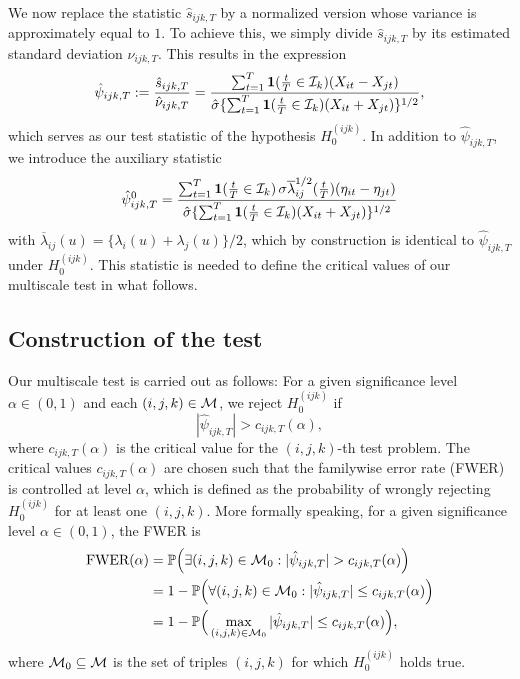 \documentclass[a4paper,12pt]{article}
\numberwithin{equation}{section}
\begin{document}
{We now replace the statistic $\hat{s}_{ijk,T}$ by a normalized version whose variance is approximately equal to $1$. To achieve this, we simply divide $\hat{s}_{ijk,T}$ by its estimated standard deviation $\hat{\nu}_{ijk,T}$. This results in the expression 
\begin{equation}\label{eq:stat}
\hat{\psi}_{ijk,T} := \frac{\hat{s}_{ijk,T}}{\hat{\nu}_{ijk,T}} = \frac{\sum\nolimits_{t=1}^T \boldsymbol{1}(\frac{t}{T} \in \mathcal{I}_k) (X_{it} - X_{jt})}{ \hat{\sigma} \{ \sum\nolimits_{t=1}^T \boldsymbol{1}(\frac{t}{T} \in \mathcal{I}_k) (X_{it} + X_{jt}) \}^{1/2}}, 
\end{equation}
which serves as our test statistic of the hypothesis $H_0^{(ijk)}$. In addition to $\hat{\psi}_{ijk,T}$, we introduce the auxiliary statistic 
\begin{equation}\label{eq:stat0}
\hat{\psi}_{ijk,T}^0 = \frac{\sum\nolimits_{t=1}^T \boldsymbol{1}(\frac{t}{T} \in \mathcal{I}_k) \, \sigma \overline{\lambda}_{ij}^{1/2}(\frac{t}{T}) (\eta_{it} - \eta_{jt})}{ \hat{\sigma} \{ \sum\nolimits_{t=1}^T \boldsymbol{1}(\frac{t}{T} \in \mathcal{I}_k) (X_{it} + X_{jt}) \}^{1/2}}
\end{equation}
with $\overline{\lambda}_{ij}(u) = \{ \lambda_i(u) + \lambda_j(u) \}/2$, which by construction is identical to $\hat{\psi}_{ijk,T}$ under $H_0^{(ijk)}$. This statistic is needed to define the critical values of our multiscale test in what follows.
}


\subsection{Construction of the test} 


Our multiscale test is carried out as follows: For a given significance level $\alpha \in (0,1)$ and each $(i,j,k) \in \mathcal{M}$, we reject $H_0^{(ijk)}$ if 
\[ |\hat{\psi}_{ijk,T}| > c_{ijk,T}(\alpha), \]
where $c_{ijk,T}(\alpha)$ is the critical value for the $(i,j,k)$-th test problem. The critical values $c_{ijk,T}(\alpha)$ are chosen such that the familywise error rate (FWER) is controlled at level $\alpha$, which is defined as the probability of wrongly rejecting $H_0^{(ijk)}$ for at least one $(i,j,k)$. More formally speaking, for a given significance level $\alpha \in (0,1)$, the FWER is 
\begin{align*}
\text{FWER}(\alpha) 
 & = \mathbb{P} \Big( \exists (i,j,k) \in \mathcal{M}_0: |\hat{\psi}_{ijk,T}| > c_{ijk,T}(\alpha) \Big) \\
 & =  1 - \mathbb{P} \Big( \forall (i,j,k) \in \mathcal{M}_0: |\hat{\psi}_{ijk,T}| \le c_{ijk,T}(\alpha) \Big) \\
 & = 1 - \mathbb{P}\Big( \max_{(i,j,k) \in \mathcal{M}_0} |\hat{\psi}_{ijk,T}| \le c_{ijk,T}(\alpha) \Big), 
\end{align*}
where $\mathcal{M}_0 \subseteq \mathcal{M}$ is the set of triples $(i,j,k)$ for which $H_0^{(ijk)}$ holds true.  
\end{document}
